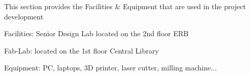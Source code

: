 This section provides the Facilities \& Equipment that are used in the project development \newline

Facilities:  Senior Design Lab located on the 2nd floor ERB \newline

Fab-Lab: located on the 1st floor Central Library \newline

Equipment: PC, laptops, 3D printer, laser cutter, milling machine...
